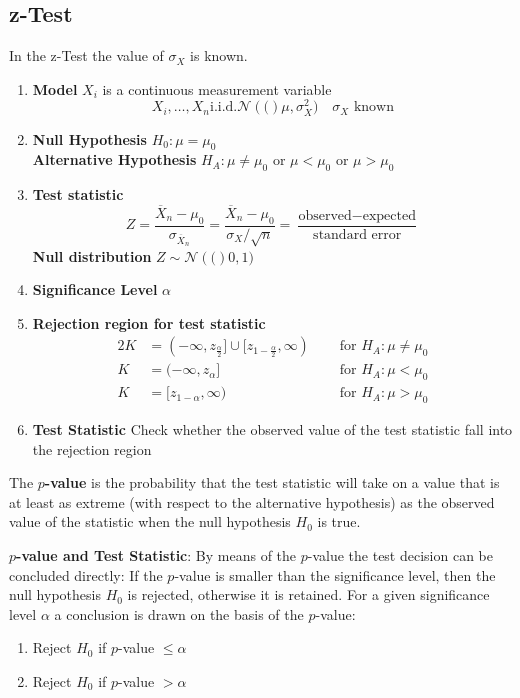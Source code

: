 \documentclass[11pt]{article}
\theoremstyle{definition}
\newcommand*\samplemean[1]{\overline{#1}}
\newcommand*\N[1]{\mathcal{N}\left(#1\right)}
\begin{document}
\subsection{z-Test}
In the z-Test the value of $\sigma_X$ is known.
\begin{enumerate}
	\item \textbf{Model} $X_i$ is a continuous measurement variable
	\begin{equation*}
		X_i, \dots, X_n \text{i.i.d.} \N(\mu, \sigma_X^2)\quad \sigma_X\text{ known}
	\end{equation*}
	\item \textbf{Null Hypothesis} $H_0: \mu = \mu_0$\\ \textbf{Alternative Hypothesis} $H_A: \mu \neq \mu_0 \text{ or } \mu < \mu_0 \text{ or } \mu > \mu_0$
	\item \textbf{Test statistic}
	\begin{equation*}
		Z = \frac{\samplemean{X}_n - \mu_0}{\sigma_{\samplemean{X}_n}} = \frac{\samplemean{X}_n - \mu_0}{\sigma_X / \sqrt{n}} = \frac{\text{observed} - \text{expected}}{\text{standard error}}
	\end{equation*}
	\textbf{Null distribution} $Z \sim \N(0,1)$
	\item \textbf{Significance Level} $\alpha$
	\item \textbf{Rejection region for test statistic}
	\begin{alignat*}{2}
		K &= (-\infty,z_{\frac{\alpha}{2}}] \cup [z_{1-\frac{\alpha}{2}}, \infty) &\quad \text{ for } H_A : \mu\neq \mu_0\\
		K &= (-\infty, z_\alpha] &\quad \text{ for } H_A : \mu < \mu_0\\
		K &= [ z_{1-\alpha}, \infty ) &\quad \text{ for } H_A : \mu > \mu_0
	\end{alignat*}
	\item \textbf{Test Statistic} Check whether the observed value of the test statistic fall into the rejection region
\end{enumerate}

\begin{definition}
	The \textbf{$p$-value} is the probability that the test statistic will take on a value that is at least as extreme (with respect to the alternative hypothesis) as the observed value of the statistic when the null hypothesis $H_0$ is true.
\end{definition}

\begin{definition}
	\textbf{$p$-value and Test Statistic}: By means of the $p$-value the test decision can be concluded directly: If the $p$-value is smaller than the significance level, then  the null hypothesis $H_0$ is rejected, otherwise it is retained. For a given significance level $\alpha$ a conclusion is drawn on the basis of the $p$-value:
	\begin{enumerate}
		\item Reject $H_0$ if $p$-value $\leq \alpha$
		\item Reject $H_0$ if $p$-value $> \alpha$
	\end{enumerate}
\end{definition}
\end{document}
